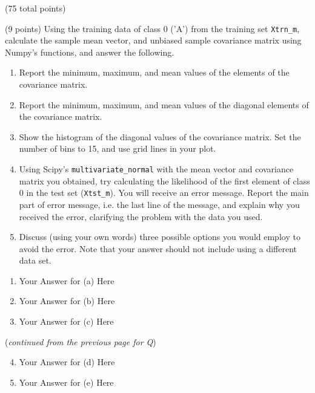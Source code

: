 \documentclass[12pt]{article}
\begin{document}
\begin{question}{(75 total points) \qTwoTitle}
\begin{subquestion}{(9 points)
    Using the training data of class 0 ('A') from the training set {\tt Xtrn\_m}, calculate the sample mean vector, and unbiased sample covariance matrix using Numpy's functions, and answer the following.
  } \label{q2:gaussian-1}
  \begin{enumerate}\NARROWITEM
  \item Report the minimum, maximum, and mean values of the elements of the covariance matrix.
  \item Report the minimum, maximum, and mean values of the diagonal elements of the covariance matrix.
  \item Show the histogram of the diagonal values of the covariance matrix. Set the number of bins to 15, and use grid lines in your plot.
  \item Using Scipy's {\tt multivariate\_normal} with the mean vector and covariance matrix you obtained, try calculating the likelihood of the first element of class 0 in the test set ({\tt Xtst\_m}). You will receive an error message. Report the main part of error message, i.e. the last line of the message, and explain why you received the error, clarifying the problem with the data you used.
  \item Discuss (using your own words) three possible options you would employ to avoid the error. Note that your answer should not include using a different data set. 
  \end{enumerate}
   

  \begin{answerbox}{0.65\textheight}
    \begin{enumerate}
    \item Your Answer for (a) Here
    \item Your Answer for (b) Here
    \item Your Answer for (c) Here
    \end{enumerate}
  \end{answerbox}
  \clearpage
  ({\it continued from the previous page for Q\label{q2:gaussian-1}})
  \begin{answerbox}{0.5\textheight}
    \begin{enumerate}\setcounter{enumi}{3}
    \item Your Answer for (d) Here
    \item Your Answer for (e) Here
    \end{enumerate}
  \end{answerbox}


\end{subquestion}
\end{question}
\end{document}
